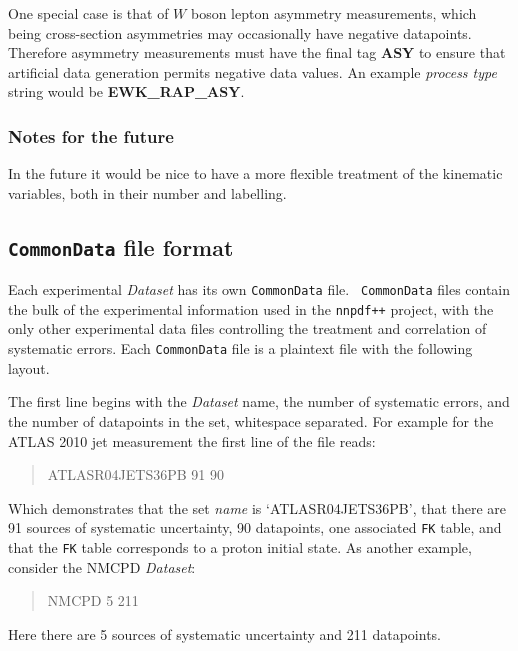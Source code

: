 \documentclass[11pt]{article}
\begin{document}
One special case is that of $W$ boson lepton asymmetry measurements, which being
cross-section asymmetries may occasionally have negative datapoints. Therefore
asymmetry measurements must have the final tag \textbf{ASY} to ensure that
artificial data generation permits negative data values. An example
\emph{process type} string would be \textbf{EWK\_RAP\_ASY}.

\subsubsection*{Notes for the future}
In the future it would be nice to have a more flexible treatment of the
kinematic variables, both in their number and labelling.


\subsection{{\tt CommonData} file format}
Each experimental \emph{Dataset} has its own {\tt CommonData} file. {\tt
CommonData} files contain the bulk of the experimental information used in the
{\tt nnpdf++} project, with the only other experimental data files controlling
the treatment and correlation of systematic errors. Each {\tt CommonData} file
is a plaintext file with the following layout.

The first line begins with the \emph{Dataset} name, the number of systematic
errors, and the number of datapoints in the set, whitespace separated.  For
example for the ATLAS 2010 jet measurement the first line of the file reads:
%
\begin{quotation}\noindent
ATLASR04JETS36PB        91      90
\end{quotation}
%
Which demonstrates that the set \emph{name} is `ATLASR04JETS36PB', that there
are 91 sources of systematic uncertainty, 90 datapoints, one associated {\tt FK}
table, and that the {\tt FK} table corresponds to a proton initial state. As
another example, consider the NMCPD \emph{Dataset}:
%
\begin{quotation}\noindent
NMCPD   5       211
\end{quotation}
%
Here there are 5 sources of systematic uncertainty and 211 datapoints.
\end{document}
